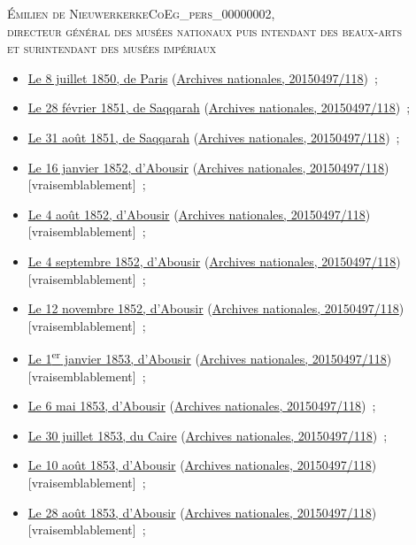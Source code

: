 \documentclass{book}
\begin{document}
{\begin{center} \textsc{Émilien de Nieuwerkerke\gls{CoEg_pers_00000002},\\
directeur général des musées nationaux puis intendant des beaux-arts\\
et surintendant des musées impériaux}\end{center}
\begin{itemize}
\item \hyperlink{CoEg_Mariette_1850-07-08}{Le 8 juillet 1850, de Paris} (\hyperlink{CoEg_Mariette_ms_001}{Archives nationales, 20150497/118})~;
\item \hyperlink{CoEg_Mariette_1851-02-28}{Le 28 février 1851, de Saqqarah} (\hyperlink{CoEg_Mariette_ms_001}{Archives nationales, 20150497/118})~;
\item \hyperlink{CoEg_Mariette_1851-08-31}{Le 31 août 1851, de Saqqarah} (\hyperlink{CoEg_Mariette_ms_001}{Archives nationales, 20150497/118})~;
\item \hyperlink{CoEg_Mariette_1852-01-16}{Le 16 janvier 1852, d’Abousir} (\hyperlink{CoEg_Mariette_ms_001}{Archives nationales, 20150497/118}) [vraisemblablement]~;
\item \hyperlink{CoEg_Mariette_1852-08-04}{Le 4 août 1852, d’Abousir} (\hyperlink{CoEg_Mariette_ms_001}{Archives nationales, 20150497/118}) [vraisemblablement]~;
\item \hyperlink{CoEg_Mariette_1852-09-04}{Le 4 septembre 1852, d’Abousir} (\hyperlink{CoEg_Mariette_ms_001}{Archives nationales, 20150497/118}) [vraisemblablement]~;
\item \hyperlink{CoEg_Mariette_1852-11-12}{Le 12 novembre 1852, d’Abousir} (\hyperlink{CoEg_Mariette_ms_001}{Archives nationales, 20150497/118}) [vraisemblablement]~;
\item \hyperlink{CoEg_Mariette_1853-01-01}{Le 1\textsuperscript{er} janvier 1853, d’Abousir} (\hyperlink{CoEg_Mariette_ms_001}{Archives nationales, 20150497/118}) [vraisemblablement]~;
\item \hyperlink{CoEg_Mariette_1853-05-06}{Le 6 mai 1853, d’Abousir} (\hyperlink{CoEg_Mariette_ms_001}{Archives nationales, 20150497/118})~;
\item \hyperlink{CoEg_Mariette_1853-07-30}{Le 30 juillet 1853, du Caire} (\hyperlink{CoEg_Mariette_ms_001}{Archives nationales, 20150497/118})~;
\item \hyperlink{CoEg_Mariette_1853-08-10}{Le 10 août 1853, d’Abousir} (\hyperlink{CoEg_Mariette_ms_001}{Archives nationales, 20150497/118}) [vraisemblablement]~;
\item \hyperlink{CoEg_Mariette_1853-08-28}{Le 28 août 1853, d’Abousir} (\hyperlink{CoEg_Mariette_ms_001}{Archives nationales, 20150497/118}) [vraisemblablement]~;

\end{itemize}}
\end{document}
